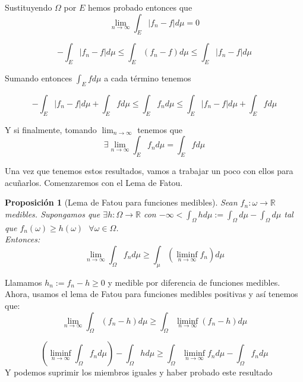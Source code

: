 \documentclass[11pt, a4paper]{article}
\makeatletter
\newif\IfInSansMode
\let\oldsf\sffamily
\renewcommand*{\sffamily}{\oldsf\mathversion{sans}\InSansModetrue}
\let\oldnorm\normalfont
\renewcommand*{\normalfont}{\oldnorm\InSansModefalse\mathversion{normal}}
\providecommand{\abs}[1]{\lvert#1\rvert}
\newcommand{\R}{\mathbb{R}} \newcommand{\N}{\mathbb{N}}
\renewenvironment{proof}[1][\proofname] {\par\pushQED{\qed}\normalfont\topsep6\p@\@plus6\p@\relax\trivlist\item[\hskip\labelsep\itshape\sffamily#1\@addpunct{.}]\ignorespaces}{\popQED\endtrivlist\@endpefalse}
\theoremstyle{theorem-style}
\newtheorem{nprop}{Proposición}[section]
\theoremstyle{definition-style}
\theoremstyle{remark-style}
\theoremstyle{example-style}
\makeatother
\begin{document}
\begin{proof}
  Sustituyendo $\Omega$  por $E$ hemos probado entonces que 
  $$\lim_{n \to \infty} \int_{E} \abs{f_n - f} d \mu = 0$$
  
  $$- \int_E \abs{f_n - f} d \mu \leq \int_E (f_n - f) d \mu \leq \int_E \abs{f_n - f} d \mu$$
  
  Sumando entonces $\displaystyle \int_E f d \mu$ a cada término tenemos
  
  $$ - \int_E \abs{f_n - f} d \mu + \int_E f d \mu \leq \int_E f_n d \mu \leq \int_E \abs{f_n - f} d \mu + \int_E f d \mu$$
  
  Y si finalmente, tomando $\lim_{n \to \infty}$ tenemos que
  $$ \exists \lim_{n \to \infty} \int_E f_n d \mu = \int_E f d \mu$$
\end{proof}

Una vez que tenemos estos resultados, vamos a trabajar un poco con ellos para acuñarlos. Comenzaremos con el Lema de Fatou.

\begin{nprop}[Lema de Fatou para funciones medibles]
  Sean $f_n: \omega \to \R$ medibles. Supongamos que $\exists h: \Omega \to \R$ con $-\infty < \int_\Omega h d\mu := \int_\Omega d\mu - \int_\Omega d\mu $ tal que $f_n(\omega) \geq h(\omega) \ \ \ \forall \omega \in \Omega$.\\
  Entonces:
  $$ \lim_{n\to \infty}\int_\Omega f_n d\mu \geq \int_\mu (\liminf_{n\to \infty}f_n )d\mu$$
\end{nprop}
\begin{proof}
  Llamamos $h_n:= f_n - h \geq 0$ y medible por diferencia de funciones medibles. Ahora, usamos el lema de Fatou para funciones medibles positivas y así tenemos que:
  $$ \lim_{n\to \infty} \int_\Omega (f_n -h) d\mu \geq \int_\Omega \liminf_{n\to \infty}(f_n - h) d\mu$$
  
  $$ ( \liminf_{n\to \infty}\int_\Omega f_n d\mu )  - \int_\Omega h d\mu \geq \int_\Omega \liminf_{n\to \infty} f_n d\mu - \int_\Omega f_n d\mu$$
  Y podemos suprimir los miembros iguales y haber probado este resultado
\end{proof} 
\end{document}
